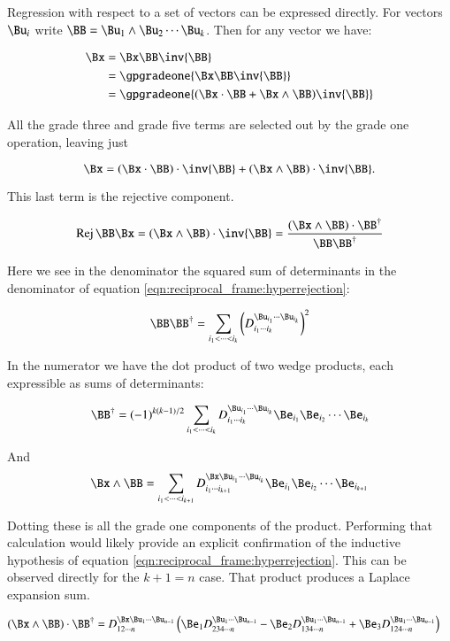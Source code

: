 Regression with respect to a set of vectors can be expressed directly.  For vectors ${\Bu_i}$ write $\BB = \Bu_1 \wedge \Bu_2 \cdots \Bu_k$.  Then for any vector we have:

\begin{align*}
\Bx 
&= \Bx \BB \inv{\BB}  \\
&= \gpgradeone{ \Bx \BB \inv{\BB} } \\
&= \gpgradeone{ (\Bx \cdot \BB + \Bx \wedge \BB) \inv{\BB} }
\end{align*}

All the grade three and grade five terms are selected out by the grade one operation, leaving just

\begin{equation}
\Bx = (\Bx \cdot \BB) \cdot \inv{\BB} + (\Bx \wedge \BB) \cdot \inv{\BB}.
\end{equation}

This last term is the rejective component.

\begin{equation}\label{eqn:reciprocal_frame:bladerejection}
\Rej{\BB}{\Bx} = 
(\Bx \wedge \BB) \cdot \inv{\BB}
=
\frac{
(\Bx \wedge \BB) \cdot {\BB}^\dagger
}
{
\BB \BB^\dagger
}
\end{equation}

Here we see in the denominator the squared sum of determinants in the denominator of equation \ref{eqn:reciprocal_frame:hyperrejection}:

\[
\BB \BB^\dagger = 
\sum_{i_1 < \cdots < i_{k} } \left(D_{i_1 \cdots i_{k}}^{\Bu_{i_1} \cdots \Bu_{i_{k}}}\right)^2
\]

In the numerator we have the dot product of two wedge products, each expressible as sums of determinants:

\[
\BB^\dagger = (-1)^{k(k-1)/2}
\sum_{i_1 < \cdots < i_{k} } 
D_{i_1 \cdots i_{k}}^{\Bu_{i_1} \cdots \Bu_{i_{k}}} \Be_{i_1} \Be_{i_2} \cdots \Be_{i_{k}}
\]

And
\[
\Bx \wedge \BB = 
\sum_{i_1 < \cdots < i_{k+1} } 
D_{i_1 \cdots i_{k+1}}^{\Bx \Bu_{i_1} \cdots \Bu_{i_{k}}} \Be_{i_1} \Be_{i_2} \cdots \Be_{i_{k+1}}
\]

Dotting these is all the grade one components of the product.  
Performing that calculation would likely provide an explicit confirmation of the inductive hypothesis of 
equation \ref{eqn:reciprocal_frame:hyperrejection}.  This can be observed directly for the $k+1=n$ case.  That product produces a Laplace
expansion sum.

\begin{align*}
(\Bx \wedge \BB) \cdot \BB^\dagger
&=
D_{1 2 \cdots n}^{\Bx \Bu_{1} \cdots \Bu_{n-1}} 
\left(
\Be_{1} D_{2 3 4 \cdots n}^{\Bu_{1} \cdots \Bu_{n-1}}
-\Be_{2} D_{1 3 4 \cdots n}^{\Bu_{1} \cdots \Bu_{n-1}}
+\Be_{3} D_{1 2 4 \cdots n}^{\Bu_{1} \cdots \Bu_{n-1}}
\right)
\end{align*}

